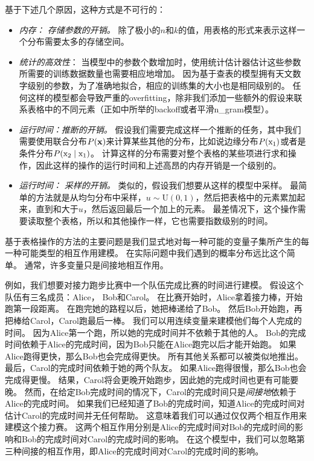 基于下述几个原因，这种方式是不可行的：
\begin{itemize}
\item \emph{内存： 存储参数的开销。}
除了极小的$n$和$k$的值，用表格的形式来表示这样一个分布需要太多的存储空间。
	
\item  \emph{统计的高效性}： 
当模型中的参数个数增加时，使用统计估计器估计这些参数所需要的训练数据数量也需要相应地增加。
因为基于查表的模型拥有天文数字级别的参数，为了准确地拟合，相应的训练集的大小也是相同级别的。
任何这样的模型都会导致严重的\gls{overfitting}，除非我们添加一些额外的假设来联系表格中的不同元素（正如中所举的\gls{backoff}或者平滑\gls{n_gram}模型）。
	
\item \emph{运行时间：推断的开销。}
假设我们需要完成这样一个推断的任务，其中我们需要使用联合分布$P(\mathbf{x})$来计算某些其他的分布，比如说边缘分布$P(\mathrm{x}_1)$或者是条件分布$P(\mathrm{x}_2\mid \mathrm{x}_1)$。
计算这样的分布需要对整个表格的某些项进行求和操作，因此这样的操作的运行时间和上述高昂的内存开销是一个级别的。
	
	
\item \emph{运行时间： 采样的开销。}
类似的，假设我们想要从这样的模型中采样。
最简单的方法就是从均匀分布中采样，$u\sim \text{U}(0,1)$，然后把表格中的元素累加起来，直到和大于$u$，然后返回最后一个加上的元素。
最差情况下，这个操作需要读取整个表格，所以和其他操作一样，它也需要指数级别的时间。
\end{itemize}



基于表格操作的方法的主要问题是我们显式地对每一种可能的变量子集所产生的每一种可能类型的相互作用建模。
在实际问题中我们遇到的概率分布远比这个简单。
通常，许多变量只是间接地相互作用。


例如，我们想要对接力跑步比赛中一个队伍完成比赛的时间进行建模。
假设这个队伍有三名成员：Alice， Bob和Carol。
在比赛开始时，Alice拿着接力棒，开始跑第一段距离。
在跑完她的路程以后，她把棒递给了Bob。
然后Bob开始跑，再把棒给Carol，Carol跑最后一棒。
我们可以用连续变量来建模他们每个人完成的时间。
因为Alice第一个跑，所以她的完成时间并不依赖于其他的人。
Bob的完成时间依赖于Alice的完成时间，因为Bob只能在Alice跑完以后才能开始跑。
如果Alice跑得更快，那么Bob也会完成得更快。
所有其他关系都可以被类似地推出。
最后，Carol的完成时间依赖于她的两个队友。
如果Alice跑得很慢，那么Bob也会完成得更慢。
结果，Carol将会更晚开始跑步，因此她的完成时间也更有可能要晚。
然而，在给定Bob完成时间的情况下，Carol的完成时间只是\emph{间接地}依赖于Alice的完成时间。
如果我们已经知道了Bob的完成时间，知道Alice的完成时间对估计Carol的完成时间并无任何帮助。
这意味着我们可以通过仅仅两个相互作用来建模这个接力赛。
这两个相互作用分别是Alice的完成时间对Bob的完成时间的影响和Bob的完成时间对Carol的完成时间的影响。
在这个模型中，我们可以忽略第三种间接的相互作用，即Alice的完成时间对Carol的完成时间的影响。


